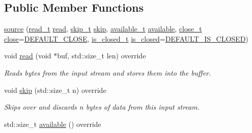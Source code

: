 \subsection*{Public Member Functions}
\begin{DoxyCompactItemize}
\item 
\hyperlink{structdevfix_1_1base_1_1io_1_1source_af8bef20f5b54153c3fd1fbc7daa263c5}{source} (\hyperlink{namespacedevfix_1_1base_1_1io_afa65222ee5a1636be18df5e16bbcf858}{read\+\_\+t} \hyperlink{structdevfix_1_1base_1_1io_1_1source_a9fbd4d20aa150910ced44018e1b3156a}{read}, \hyperlink{namespacedevfix_1_1base_1_1io_aeb8f94d85cfeaa405f53a6967e609645}{skip\+\_\+t} \hyperlink{structdevfix_1_1base_1_1io_1_1source_a21cb579307589cbc6f9e02d64c66f4b2}{skip}, \hyperlink{namespacedevfix_1_1base_1_1io_a19c1195ab6a44e6d4f48b86062860a11}{available\+\_\+t} \hyperlink{structdevfix_1_1base_1_1io_1_1source_a911f4ba79499a623de30cf16d3d26d47}{available}, \hyperlink{namespacedevfix_1_1base_1_1io_ae3118387742e5f4d484a328a213d6a5d}{close\+\_\+t} \hyperlink{structdevfix_1_1base_1_1io_1_1source_aa00a381c8a166cbbc5dbf6de4b56590e}{close}=\hyperlink{namespacedevfix_1_1base_1_1io_a14a286c17d4b93881d42b1d14beb2d0b}{D\+E\+F\+A\+U\+L\+T\+\_\+\+C\+L\+O\+SE}, \hyperlink{namespacedevfix_1_1base_1_1io_a14f89d4437ced6ede49c044ee8e71f17}{is\+\_\+closed\+\_\+t} \hyperlink{structdevfix_1_1base_1_1io_1_1source_a406834cf6651d48949b96d0ef49cc6c1}{is\+\_\+closed}=\hyperlink{namespacedevfix_1_1base_1_1io_ae04fec2a2a2db3482e624a59e59a2a14}{D\+E\+F\+A\+U\+L\+T\+\_\+\+I\+S\+\_\+\+C\+L\+O\+S\+ED})
\item 
void \hyperlink{structdevfix_1_1base_1_1io_1_1source_a9fbd4d20aa150910ced44018e1b3156a}{read} (void $\ast$buf, std\+::size\+\_\+t len) override
\begin{DoxyCompactList}\small\item\em Reads bytes from the input stream and stores them into the buffer. \end{DoxyCompactList}\item 
void \hyperlink{structdevfix_1_1base_1_1io_1_1source_a21cb579307589cbc6f9e02d64c66f4b2}{skip} (std\+::size\+\_\+t n) override
\begin{DoxyCompactList}\small\item\em Skips over and discards n bytes of data from this input stream. \end{DoxyCompactList}\item 
std\+::size\+\_\+t \hyperlink{structdevfix_1_1base_1_1io_1_1source_a911f4ba79499a623de30cf16d3d26d47}{available} () override

\end{DoxyCompactItemize}
